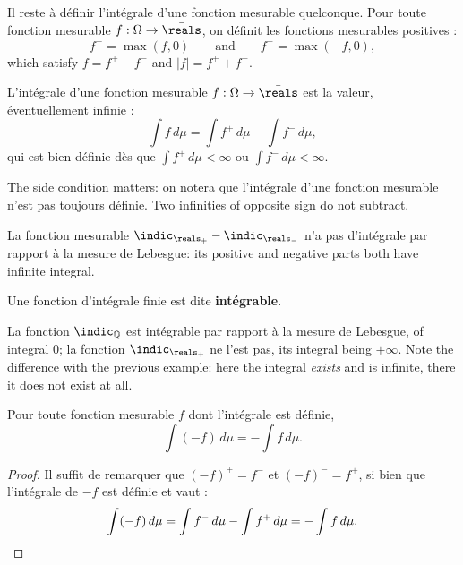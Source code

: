 Il reste à définir l'intégrale d'une fonction mesurable quelconque. Pour toute
fonction mesurable $f : \Omega \to \bar{\reals}$, on définit les fonctions
mesurables positives :
\[
  f^{+} = \max(f,0) \qquad \text{and} \qquad f^{-} = \max(-f,0),
\]
which satisfy $f = f^{+} - f^{-}$ and $|f| = f^{+} + f^{-}$.

\begin{definition}
  L'intégrale d'une fonction mesurable $f : \Omega \to \bar{\reals}$ est la valeur,
  éventuellement infinie :
  \[
    \int f \, d\mu = \int f^{+} \, d\mu - \int f^{-} \, d\mu ,
  \]
  qui est bien définie dès que $\int f^{+} \, d\mu < \infty$ ou $\int f^{-} \,
  d\mu < \infty$.
\end{definition}

The side condition matters: on notera que l'intégrale d'une fonction mesurable n'est
pas toujours définie. Two infinities of opposite sign do not subtract.

\begin{example}
  La fonction mesurable $\indic_{\reals_{+}} - \indic_{\reals_{-}}$ n'a pas
  d'intégrale par rapport à la mesure de Lebesgue: its positive and negative parts
  both have infinite integral.
\end{example}

\begin{definition}[Intégrabilité]
  Une fonction d'intégrale finie est dite \textbf{intégrable}.
\end{definition}

\begin{example}
  La fonction $\indic_{\mathbb{Q}}$ est intégrable par rapport à la mesure de
  Lebesgue, of integral $0$; la fonction $\indic_{\reals_{+}}$ ne l'est pas, its
  integral being $+\infty$. Note the difference with the previous example: here the
  integral \emph{exists} and is infinite, there it does not exist at all.
\end{example}

\begin{prop}
  Pour toute fonction mesurable $f$ dont l'intégrale est définie,
  \[
    \int (-f) \, d\mu = - \int f \, d\mu .
  \]
\end{prop}

\begin{proof}
  Il suffit de remarquer que $(-f)^{+} = f^{-}$ et $(-f)^{-} = f^{+}$, si bien que
  l'intégrale de $-f$ est définie et vaut :
  \[
    \int (-f) \, d\mu = \int f^{-} \, d\mu - \int f^{+} \, d\mu
    = - \int f \, d\mu . \qedhere
  \]
\end{proof}

